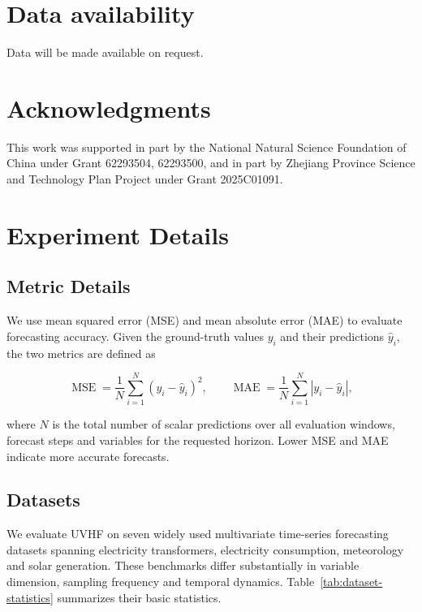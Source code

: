 \documentclass[final,3p,times]{elsarticle}
\newif\ifshowrevisions
\newcommand{\rev}[1]{\ifshowrevisions\textcolor{revisionblue}{#1}\else#1\fi}
\begin{document}
\section*{Data availability}
Data will be made available on request.

\section*{Acknowledgments}
This work was supported in part by the National Natural Science Foundation of China under Grant 62293504, 62293500, and in part by Zhejiang Province Science and Technology Plan Project under Grant 2025C01091.

\appendix
\renewcommand*{\theHtable}{appendix.\Alph{section}.\arabic{table}}
\renewcommand*{\theHfigure}{appendix.\Alph{section}.\arabic{figure}}

\setcounter{table}{0}
\setcounter{figure}{0}
\section{Experiment Details}
\label{app:experiment-details}


\subsection{Metric Details}


We use mean squared error (MSE) and mean absolute error (MAE) to evaluate forecasting accuracy. Given the ground-truth values $y_i$ and their predictions $\widehat y_i$, the two metrics are defined as

\[
\operatorname{MSE}
=
\frac{1}{N}
\sum_{i=1}^{N}
\left(y_i-\widehat y_i\right)^2,
\qquad
\operatorname{MAE}
=
\frac{1}{N}
\sum_{i=1}^{N}
\left|y_i-\widehat y_i\right|,
\]


where $N$ is the total number of scalar predictions over all evaluation windows, forecast steps and variables for the requested horizon. Lower MSE and MAE indicate more accurate forecasts.

\subsection{Datasets}


We evaluate \rev{UVHF} on seven widely used multivariate time-series forecasting datasets spanning electricity transformers, electricity consumption, meteorology and solar generation. These benchmarks differ substantially in variable dimension, sampling frequency and temporal dynamics. Table~\ref{tab:dataset-statistics} summarizes their basic statistics.
\end{document}
